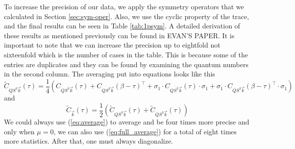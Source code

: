 To increase the precision of our data, we apply the symmetry operators that we calculated in Section \ref{sec:sym-oper}. Also, we use the cyclic property of the trace, and the final results can be seen in Table \ref{tab:1psym}. A detailed derivation of these results as mentioned previously can be found in EVAN'S PAPER. It is important to note that we can increase the precision up to eightfold not sixteenfold which is the number of cases in the table. This is because some of the entries are duplicates and they can be found by examining the quantum numbers in the second column. The averaging put into equations looks like this
\begin{equation}
  \tilde{C}_{QS^3\vec{k}}(\tau) = \frac{1}{4}\left( C_{QS^3\vec{k}}(\tau) + C_{\overline{QS^3}\vec{k}}(\beta-\tau)^\top + \sigma_1\cdot C_{Q\overline{S^3}\vec{k}}(\tau) \cdot\sigma_1 + \sigma_1\cdot C_{\overline{Q}S^3\vec{k}}(\beta-\tau)^\top \cdot\sigma_1 \right)
  \label{eq:average}
\end{equation}
and
\begin{equation}
  \tilde{C}_{\vec{k}}(\tau) = \frac{1}{2}\left( \tilde{C}_{QS^3\vec{k}}(\tau) + \tilde{C}_{\overline{Q}S^3\vec{k}}(\tau) \right)
  \label{eq:full_average}
\end{equation}
We could always use (\ref{eq:average}) to average and be four times more precise and only when $\mu = 0$, we can also use (\ref{eq:full_average}) for a total of eight times more statistics. After that, one must always diagonalize.

